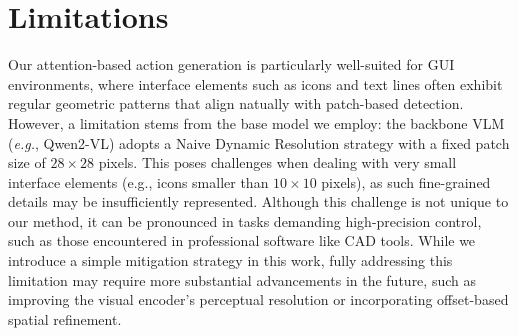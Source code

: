 \documentclass{article}
\newcommand{\eg}{\textit{e.g.}}
\begin{document}





{
\small







}



\appendix

\section{Limitations}\label{app:limitations}
Our attention-based action generation is particularly well-suited for GUI environments, where interface elements such as icons and text lines often exhibit regular geometric patterns that align natually with patch-based detection. However, a limitation stems from the base model we employ: the backbone VLM (\eg, Qwen2-VL) adopts a Naive Dynamic Resolution strategy with a fixed patch size of $28\times28$ pixels. This poses challenges when dealing with very small interface elements (e.g., icons smaller than $10\times10$ pixels), as such fine-grained details may be insufficiently represented. Although this challenge is not unique to our method, it can be pronounced in tasks demanding high-precision control, such as those encountered in professional software like CAD tools. While we introduce a simple mitigation strategy in this work, fully addressing this limitation may require more substantial advancements in the future, such as improving the visual encoder’s perceptual resolution or incorporating offset-based spatial refinement.
\end{document}
